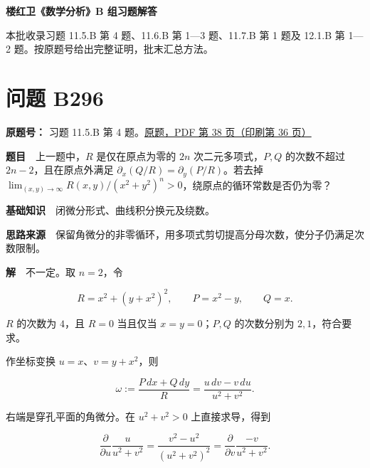 \documentclass[11pt,a4paper]{article}
\begin{document}
\begin{center}
{\Large\bfseries 楼红卫《数学分析》B 组习题解答\par}
\vspace{7pt}{\large 第四十三批\quad B296—B302\par}
\vspace{5pt}{循环常数反例、幂级数与 Fourier 系数\par}
\end{center}
本批收录习题 11.5.B 第 4 题、11.6.B 第 1—3 题、11.7.B 第 1 题及 12.1.B 第 1—2 题。按原题号给出完整证明，批末汇总方法。
\begingroup\setlength{\parskip}{0pt}\tableofcontents\endgroup

\section{问题 B296}\label{ux95eeux9898-b296}

\textbf{原题号：} 习题 11.5.B 第 4
题。\href{https://zj139.github.io/math-notes/files/problems/楼分析习题-v2.pdf\#page=38}{原题，PDF
第 38 页（印刷第 36 页）}

\textbf{题目}　上一题中，\(R\) 是仅在原点为零的 \(2n\)
次二元多项式，\(P,Q\) 的次数不超过 \(2n-2\)，且在原点外满足
\(\partial_x(Q/R)=\partial_y(P/R)\)。若去掉
\(\lim_{(x,y)\to\infty}R(x,y)/(x^2+y^2)^n>0\)，绕原点的循环常数是否仍为零？

\textbf{基础知识}　闭微分形式、曲线积分换元及绕数。

\textbf{思路来源}　保留角微分的非零循环，用多项式剪切提高分母次数，使分子仍满足次数限制。

\textbf{解}　不一定。取 \(n=2\)，令

\begin{equation}
R=x^2+(y+x^2)^2,\qquad P=x^2-y,\qquad Q=x.
\tag{1}
\end{equation}

\(R\) 的次数为 \(4\)，且 \(R=0\) 当且仅当 \(x=y=0\)；\(P,Q\)
的次数分别为 \(2,1\)，符合要求。

作坐标变换 \(u=x\)、\(v=y+x^2\)，则

\begin{equation}
\omega:=\frac{P\,dx+Q\,dy}{R}
=\frac{u\,dv-v\,du}{u^2+v^2}.
\tag{2}
\end{equation}

右端是穿孔平面的角微分。在 \(u^2+v^2>0\) 上直接求导，得到

\begin{equation}
\frac{\partial}{\partial u}\frac{u}{u^2+v^2}
=\frac{v^2-u^2}{(u^2+v^2)^2}
=\frac{\partial}{\partial v}\frac{-v}{u^2+v^2}.
\tag{3}
\end{equation}
\end{document}
